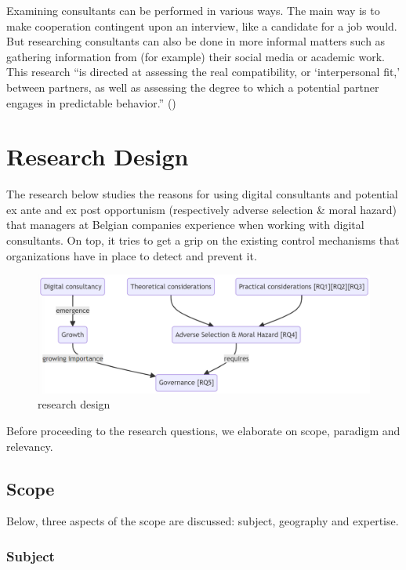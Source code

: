 \documentclass[
  man,floatsintext]{apa6}
\begin{document}
Examining consultants can be performed in various ways. The main way is to make cooperation contingent upon an interview, like a candidate for a job would. But researching consultants can also be done in more informal matters such as gathering information from (for example) their social media or academic work. This research ``is directed at assessing the real compatibility, or `interpersonal fit,' between partners, as well as assessing the degree to which a potential partner engages in predictable behavior.'' ()

\section{Research Design}\label{research-design}

The research below studies the reasons for using digital consultants and potential ex ante and ex post opportunism (respectively adverse selection \& moral hazard) that managers at Belgian companies experience when working with digital consultants. On top, it tries to get a grip on the existing control mechanisms that organizations have in place to detect and prevent it.

\begin{figure}

{\centering \includegraphics[width=0.8\linewidth]{rd} 

}

\caption{research design}\label{fig:unnamed-chunk-2}
\end{figure}

Before proceeding to the research questions, we elaborate on scope, paradigm and relevancy.

\subsection{Scope}\label{scope}

Below, three aspects of the scope are discussed: subject, geography and expertise.

\subsubsection{Subject}\label{subject}
\end{document}
